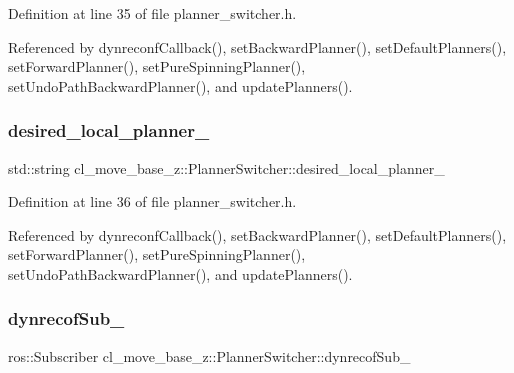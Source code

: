 Definition at line 35 of file planner\+\_\+switcher.\+h.



Referenced by dynreconf\+Callback(), set\+Backward\+Planner(), set\+Default\+Planners(), set\+Forward\+Planner(), set\+Pure\+Spinning\+Planner(), set\+Undo\+Path\+Backward\+Planner(), and update\+Planners().

\mbox{\label{classcl__move__base__z_1_1PlannerSwitcher_a6cbf65f11bb69125f913caaabdf7b4cf}} 
\subsubsection{\texorpdfstring{desired\+\_\+local\+\_\+planner\+\_\+}{desired\_local\_planner\_}}
{\footnotesize\ttfamily std\+::string cl\+\_\+move\+\_\+base\+\_\+z\+::\+Planner\+Switcher\+::desired\+\_\+local\+\_\+planner\+\_\+\hspace{0.3cm}{\ttfamily [private]}}



Definition at line 36 of file planner\+\_\+switcher.\+h.



Referenced by dynreconf\+Callback(), set\+Backward\+Planner(), set\+Default\+Planners(), set\+Forward\+Planner(), set\+Pure\+Spinning\+Planner(), set\+Undo\+Path\+Backward\+Planner(), and update\+Planners().

\mbox{\label{classcl__move__base__z_1_1PlannerSwitcher_ae902346f4f8e58241acc56cccaad8546}} 
\subsubsection{\texorpdfstring{dynrecof\+Sub\+\_\+}{dynrecofSub\_}}
{\footnotesize\ttfamily ros\+::\+Subscriber cl\+\_\+move\+\_\+base\+\_\+z\+::\+Planner\+Switcher\+::dynrecof\+Sub\+\_\+\hspace{0.3cm}{\ttfamily [private]}}



